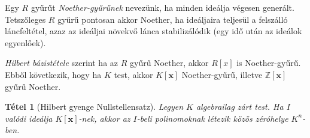 \documentclass[DIV=15,appendixprefix]{scrreprt}
\newtheorem*{tetel}{Tétel}
\theoremstyle{definition}
\theoremstyle{remark}
\begin{document}
Egy $ R $ gyűrűt
\emph{Noether-gyűrűnek} nevezünk, ha minden ideálja végesen generált. Tetszőleges $ R $ gyűrű
pontosan akkor Noether, ha ideáljaira teljesül a felszálló láncfeltétel, azaz az ideáljai növekvő
lánca stabilizálódik (egy idő után az ideálok egyenlőek).

\emph{Hilbert bázistétele} szerint ha az $ R $ gyűrű Noether, akkor $ R \left[ x \right] $ is
Noether-gyűrű. Ebből következik, hogy ha $ K $ test, akkor $ K \left[ \mathbf{ x } \right] $
Noether-gyűrű, illetve $ \mathbb{ Z } \left[ \mathbf{ x } \right] $ gyűrű Noether.
%
\begin{tetel}[Hilbert gyenge Nullstellensatz]
	Legyen $ K $ algebrailag zárt test. Ha $ I $ valódi ideálja $ K \left[ \mathbf{ x }
	\right] $-nek, akkor az $ I $-beli polinomoknak létezik közös zéróhelye $ K^{ n } $-ben.
\end{tetel}
\end{document}
